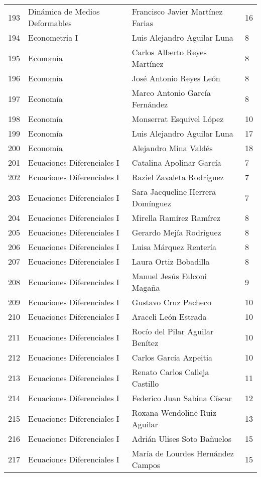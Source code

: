 \begin{table}[ht]
\begin{tabular}{rlll}
  193 & Dinámica de Medios Deformables & Francisco Javier Martínez Farias & 16 \\ 
  194 & Econometría I & Luis Alejandro Aguilar Luna & 8 \\ 
  195 & Economía & Carlos Alberto Reyes Martínez & 8 \\ 
  196 & Economía & José Antonio Reyes León & 8 \\ 
  197 & Economía & Marco Antonio García Fernández & 8 \\ 
  198 & Economía & Monserrat Esquivel López & 10 \\ 
  199 & Economía & Luis Alejandro Aguilar Luna & 17 \\ 
  200 & Economía & Alejandro Mina Valdés & 18 \\ 
  201 & Ecuaciones Diferenciales I & Catalina Apolinar García & 7 \\ 
  202 & Ecuaciones Diferenciales I & Raziel Zavaleta Rodríguez & 7 \\ 
  203 & Ecuaciones Diferenciales I & Sara Jacqueline Herrera Domínguez & 7 \\ 
  204 & Ecuaciones Diferenciales I & Mirella Ramírez Ramírez & 8 \\ 
  205 & Ecuaciones Diferenciales I & Gerardo Mejía Rodríguez & 8 \\ 
  206 & Ecuaciones Diferenciales I & Luisa Márquez Rentería & 8 \\ 
  207 & Ecuaciones Diferenciales I & Laura Ortiz Bobadilla & 8 \\ 
  208 & Ecuaciones Diferenciales I & Manuel Jesús Falconi Magaña & 9 \\ 
  209 & Ecuaciones Diferenciales I & Gustavo Cruz Pacheco & 10 \\ 
  210 & Ecuaciones Diferenciales I & Araceli León Estrada & 10 \\ 
  211 & Ecuaciones Diferenciales I & Rocío del Pilar Aguilar Benítez & 10 \\ 
  212 & Ecuaciones Diferenciales I & Carlos García Azpeitia & 10 \\ 
  213 & Ecuaciones Diferenciales I & Renato Carlos Calleja Castillo & 11 \\ 
  214 & Ecuaciones Diferenciales I & Federico Juan Sabina Císcar & 12 \\ 
  215 & Ecuaciones Diferenciales I & Roxana Wendoline Ruiz Aguilar & 13 \\ 
  216 & Ecuaciones Diferenciales I & Adrián Ulises Soto Bañuelos & 15 \\ 
  217 & Ecuaciones Diferenciales I & María de Lourdes Hernández Campos & 15 \\ 

\end{tabular}
\end{table}
